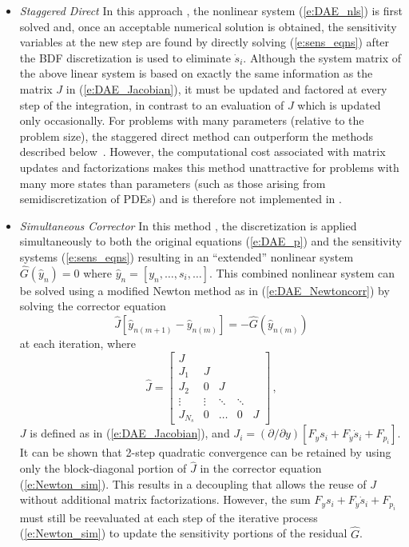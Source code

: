 \begin{itemize}

\item {\em Staggered Direct}
  In this approach \cite{CaSt:85}, the nonlinear system (\ref{e:DAE_nls}) is first
  solved and, once an acceptable numerical solution is obtained, the sensitivity 
  variables at the new step are found by directly solving (\ref{e:sens_eqns}) 
  after the BDF discretization is used to eliminate ${\dot s}_i$. 
  Although the system matrix of the above linear system is based on exactly the same
  information as the matrix $J$ in (\ref{e:DAE_Jacobian}), it must be updated and
  factored at every step of the integration, in contrast to an evaluation of
  $J$ which is updated only occasionally.  For problems with many parameters
  (relative to the problem size), the staggered direct method can outperform
  the methods described  below~\cite{LPZ:99}.
  However, the computational cost associated with matrix updates and factorizations 
  makes this method unattractive for problems with many more states than parameters
  (such as those arising from semidiscretization of PDEs) and is therefore not 
  implemented in {\idas}.
  
\item {\em Simultaneous Corrector}
  In this method \cite{MaPe:97}, the discretization is applied simultaneously
  to both the original equations (\ref{e:DAE_p}) and the sensitivity systems
  (\ref{e:sens_eqns}) resulting in an ``extended'' nonlinear system ${\hat G}({\hat y}_n) = 0$
  where ${\hat y_n} = [ y_n, \ldots, s_i, \ldots ]$.
  This combined nonlinear system can be solved using a modified Newton method as in
  (\ref{e:DAE_Newtoncorr}) by solving the corrector equation
  \begin{equation}\label{e:Newton_sim}
    {\hat J}[{\hat y}_{n(m+1)}-{\hat y}_{n(m)}]=-{\hat G}({\hat y}_{n(m)})
  \end{equation}
  at each iteration, where 
  \begin{equation*}
    {\hat J} = 
    \begin{bmatrix}
      J       &        &        &        &   \\
      J_1     & J      &        &        &   \\
      J_2     & 0      & J      &        &   \\
      \vdots  & \vdots & \ddots & \ddots &   \\
      J_{N_s} & 0      & \ldots & 0      & J 
    \end{bmatrix} \, ,
  \end{equation*}
  $J$ is defined as in (\ref{e:DAE_Jacobian}), and 
  $J_i = ({\partial}/{\partial y})\left[ F_y s_i + F_{\dot y} {\dot s_i} + F_{p_i} \right]$.
  It can be shown that 2-step quadratic convergence can be retained by using
  only the block-diagonal portion of ${\hat J}$ in the corrector equation
  (\ref{e:Newton_sim}). This results in a decoupling that allows the reuse of 
  $J$ without additional matrix factorizations. However, the sum
  $F_y s_i + F_{\dot y} {\dot s_i} + F_{p_i}$ must still be reevaluated at 
  each step of the iterative process (\ref{e:Newton_sim}) to update the 
  sensitivity portions of the residual ${\hat G}$.
  

\end{itemize}
